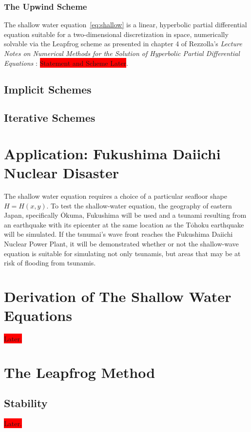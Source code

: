 \documentclass[12pt,a4]{article}
\begin{document}
\subsubsection{The Upwind Scheme}


The shallow water equation~\ref{eq:shallow} is a linear, hyperbolic partial differential equation suitable for a two-dimensional discretization in space, numerically solvable via the Leapfrog scheme as presented in chapter 4 of Rezzolla's \textit{Lecture Notes on Numerical Methods for the Solution of Hyperbolic Partial Differential Equations} \cite{rezzolla}: \colorbox{red}{Statement and Scheme Later}.
\subsection{Implicit Schemes}

\subsection{Iterative Schemes}

\section{Application: Fukushima Daiichi Nuclear Disaster}
The shallow water equation requires a choice of a particular seafloor shape $H=H(x,y)$. To test the shallow-water equation, the geography of eastern Japan, specifically $\overline{\text{O}}\text{kuma}$, Fukushima will be used and a tsunami resulting from an earthquake with its epicenter at the same location as the $\text{T}\overline{\text{o}}\text{hoku}$ earthquake will be simulated. If the tsnumai's wave front reaches the Fukushima Daiichi Nuclear Power Plant, it will be demonstrated whether or not the shallow-wave equation is suitable for simulating not only tsunamis, but areas that may be at risk of flooding from tsunamis.

\appendix
\section{Derivation of The Shallow Water Equations}\label{a:deriv}
\colorbox{red}{Later.}
\section{The Leapfrog Method}
\subsection{Stability}
\colorbox{red}{Later.}
\end{document}
